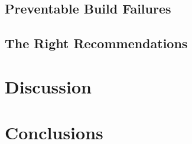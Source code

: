 \subsection{Preventable Build Failures}

\subsection{The Right Recommendations}

\section{Discussion}
\section{Conclusions}
